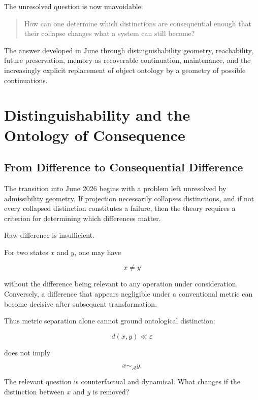 \documentclass[11pt]{article}
\theoremstyle{remark}
\newcommand{\Adm}{\mathcal{A}}
\begin{document}
The unresolved question is now unavoidable:

\begin{quote}
How can one determine which distinctions are consequential enough that their collapse changes what a system can still become?
\end{quote}

The answer developed in June through distinguishability geometry, reachability, future preservation, memory as recoverable continuation, maintenance, and the increasingly explicit replacement of object ontology by a geometry of possible continuations.

\section{Distinguishability and the Ontology of Consequence}

\subsection{From Difference to Consequential Difference}

The transition into June 2026 begins with a problem left unresolved by admissibility geometry. If projection necessarily collapses distinctions, and if not every collapsed distinction constitutes a failure, then the theory requires a criterion for determining which differences matter.

Raw difference is insufficient.

For two states $x$ and $y$, one may have

\begin{equation}
x\neq y
\end{equation}

without the difference being relevant to any operation under consideration. Conversely, a difference that appears negligible under a conventional metric can become decisive after subsequent transformation.

Thus metric separation alone cannot ground ontological distinction:

\begin{equation}
d(x,y)\ll\varepsilon
\end{equation}

does not imply

\begin{equation}
x\sim_{\Adm}y.
\end{equation}

The relevant question is counterfactual and dynamical. What changes if the distinction between $x$ and $y$ is removed?
\end{document}
